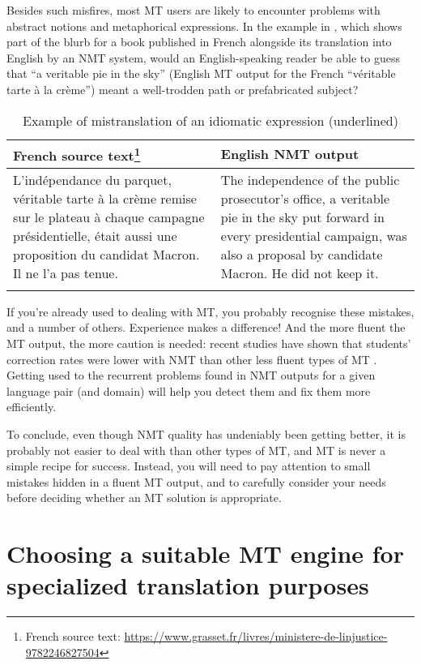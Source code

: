 \documentclass[output=paper]{langscibook}
\begin{document}
Besides such misfires, most MT users are likely to encounter problems with abstract notions and metaphorical expressions. In the example in , which shows part of the blurb for a book published in French alongside its translation into English by an NMT system, would an English-speaking reader be able to guess that “a veritable pie in the sky” (English MT output for the French “véritable tarte à la crème”) meant a well-trodden path or prefabricated subject? 


\begin{table}
\begin{tabularx}{\textwidth}{XX}
\lsptoprule
{French source text\footnote{French source text: \url{https://www.grasset.fr/livres/ministere-de-linjustice-9782246827504}}} & {English NMT output}\\
\midrule
L’indépendance du parquet, véritable tarte à la crème remise sur le plateau à chaque campagne présidentielle, était aussi une proposition du candidat Macron. Il ne l’a pas tenue. & The independence of the public prosecutor's office, a veritable pie in the sky put forward in every presidential campaign, was also a proposal by candidate Macron. He did not keep it.\\
\lspbottomrule
\end{tabularx}
\caption{Example of mistranslation of an idiomatic expression (underlined)}
\label{tab:rossi:2}
\end{table}

If you’re already used to dealing with MT, you probably recognise these mistakes, and a number of others. Experience makes a difference! And the more fluent the MT output, the more caution is needed: recent studies have shown that students’ correction rates were lower with NMT than other less fluent types of MT \citep{Yamada2019}. Getting used to the recurrent problems found in NMT outputs for a given language pair (and domain) will help you detect them and fix them more efficiently.

To conclude, even though NMT quality has undeniably been getting better, it is probably not easier to deal with than other types of MT, and MT is never a simple recipe for success. Instead, you will need to pay attention to small mistakes hidden in a fluent MT output, and to carefully consider your needs before deciding whether an MT solution is appropriate.

\section{Choosing a suitable MT engine for specialized translation purposes}
\end{document}
